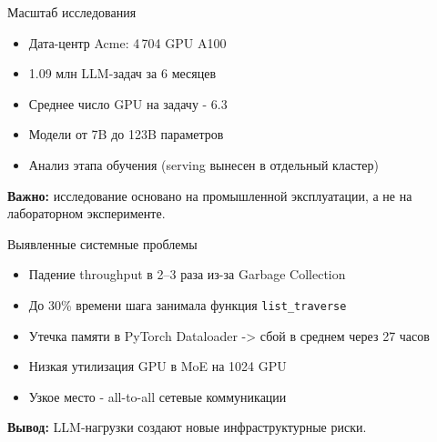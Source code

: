 \begin{frame}{Масштаб исследования}
	\begin{itemize}
		\item Дата-центр Acme: 4\,704 GPU A100
		\item 1.09 млн LLM-задач за 6 месяцев
		\item Среднее число GPU на задачу - 6.3
		\item Модели от 7B до 123B параметров
		\item Анализ этапа обучения (serving вынесен в отдельный кластер)
	\end{itemize}
		
	\vspace{0.3cm}
	\textbf{Важно:} исследование основано на промышленной эксплуатации,
	а не на лабораторном эксперименте.
\end{frame}
	
\begin{frame}{Выявленные системные проблемы}
	\begin{itemize}
		\item Падение throughput в 2--3 раза из-за Garbage Collection
		\item До 30\% времени шага занимала функция \texttt{list\_traverse}
		\item Утечка памяти в PyTorch Dataloader -> сбой в среднем через 27 часов
		\item Низкая утилизация GPU в MoE на 1024 GPU
		\item Узкое место - all-to-all сетевые коммуникации
	\end{itemize}
	\vspace{0.3cm}
	\textbf{Вывод:} LLM-нагрузки создают новые инфраструктурные риски.
\end{frame}



